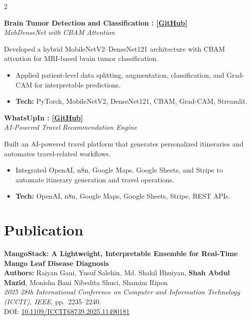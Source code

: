 \documentclass[10pt,a4paper]{article}
\newcommand{\project}[2]{
    \textbf{#1}\\
    \textit{\small #2}
}
\begin{document}
\begin{multicols}{2}
\project
{Brain Tumor Detection and Classification :
\href{YOUR_BRAIN_TUMOR_GITHUB_LINK}{[GitHub]}}
{MobDenseNet with CBAM Attention}

\vspace{0.5mm}

Developed a hybrid MobileNetV2--DenseNet121 architecture with CBAM attention for MRI-based brain tumor classification.

\begin{itemize}
\item Applied patient-level data splitting, augmentation, classification, and Grad-CAM for interpretable predictions.
\item \textbf{Tech:} PyTorch, MobileNetV2, DenseNet121, CBAM, Grad-CAM, Streamlit.
\end{itemize}

\vspace{1.5mm}

\project
{WhatsUpIn :
\href{https://github.com/Shah-Abdul-Mazid/Office_Projects/tree/master/jenstemebel}{[GitHub]}}
{AI-Powered Travel Recommendation Engine}

\vspace{0.5mm}

Built an AI-powered travel platform that generates personalized itineraries and automates travel-related workflows.

\begin{itemize}
\item Integrated OpenAI, n8n, Google Maps, Google Sheets, and Stripe to automate itinerary generation and travel operations.
\item \textbf{Tech:} OpenAI, n8n, Google Maps, Google Sheets, Stripe, REST APIs.
\end{itemize}


\section{Publication}

\textbf{MangoStack: A Lightweight, Interpretable Ensemble for Real-Time Mango Leaf Disease Diagnosis}\\
\textbf{Authors:} Raiyan Gani, Yusuf Salehin, Md. Shakil Bhuiyan, 
\textbf{Shah Abdul Mazid}, Monisha Bani Nibedita Shuci, Shamim Ripon\\[-0.5mm]
\textit{2025 28th International Conference on Computer and Information Technology (ICCIT), IEEE}, 
pp.~2235--2240.\\[-1mm]
DOI: \href{https://doi.org/10.1109/ICCIT68739.2025.11490181}
{10.1109/ICCIT68739.2025.11490181}


\end{multicols}
\end{document}

